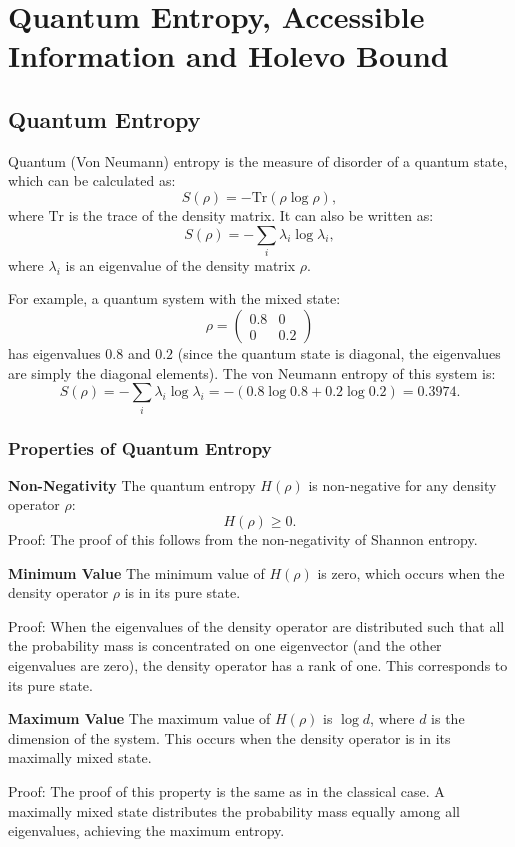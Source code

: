 \section{Quantum Entropy, Accessible Information and Holevo Bound}

\subsection{Quantum Entropy}

Quantum (Von Neumann) entropy is the measure of disorder of a quantum state, which can be calculated as:
\[
S(\rho) = -\text{Tr}(\rho \log \rho),
\]
where $\text{Tr}$ is the trace of the density matrix. It can also be written as:
\[
S(\rho) = -\sum_i \lambda_i \log \lambda_i,
\]
where $\lambda_i$ is an eigenvalue of the density matrix $\rho$.

For example, a quantum system with the mixed state:
\[
\rho = 
\begin{pmatrix}
0.8 & 0 \\
0 & 0.2
\end{pmatrix}
\]
has eigenvalues $0.8$ and $0.2$ (since the quantum state is diagonal, the eigenvalues are simply the diagonal elements). The von Neumann entropy of this system is:
\[
S(\rho) = -\sum_i \lambda_i \log \lambda_i = -(0.8 \log 0.8 + 0.2 \log 0.2) = 0.3974.
\]

\subsubsection{Properties of Quantum Entropy}

\textbf{Non-Negativity}
The quantum entropy $H(\rho)$ is non-negative for any density operator $\rho$:
\[
H(\rho) \geq 0.
\]
Proof: The proof of this follows from the non-negativity of Shannon entropy.

\textbf{Minimum Value}
The minimum value of $H(\rho)$ is zero, which occurs when the density operator $\rho$ is in its pure state.

Proof: When the eigenvalues of the density operator are distributed such that all the probability mass is concentrated on one eigenvector (and the other eigenvalues are zero), the density operator has a rank of one. This corresponds to its pure state.

\textbf{Maximum Value}
The maximum value of $H(\rho)$ is $\log d$, where $d$ is the dimension of the system. This occurs when the density operator is in its maximally mixed state.

Proof: The proof of this property is the same as in the classical case. A maximally mixed state distributes the probability mass equally among all eigenvalues, achieving the maximum entropy.

